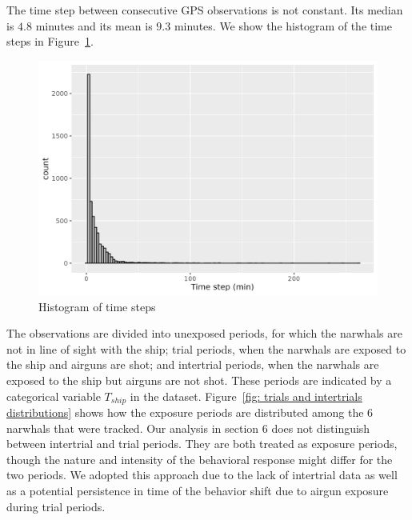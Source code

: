 \documentclass[aoas]{imsart}
\theoremstyle{definition}
\theoremstyle{remark}
\theoremstyle{remark}
\newcommand {\1}{\mathbb{1}}
\begin{document}
The time step between consecutive GPS observations is not constant. Its median is $4.8$ minutes and its mean is $9.3$ minutes. We show the histogram of the time steps in Figure~\ref{fig:alltimestepshisto}.

\begin{figure}[ht!]
	\centering
	\includegraphics[scale=0.4]{images/data_exploration/all_time_steps_histo}
	\caption{Histogram of time steps}
	\label{fig:alltimestepshisto}
\end{figure}



The observations are divided into unexposed periods, for which the narwhals are not in line of sight with the ship; trial periods, when the narwhals are exposed to the ship and airguns are shot; and intertrial periods, when the narwhals are exposed to the ship but airguns are not shot. These periods are indicated by a categorical variable $T_{ship}$ in the dataset. Figure~\ref{fig: trials and intertrials distributions} shows how the exposure periods are distributed among the $6$ narwhals that were tracked. Our analysis in section 6 does not distinguish between intertrial and trial periods. They are both treated as exposure periods, though the nature and intensity of the behavioral response might differ for the two periods. We adopted this approach due to the lack of intertrial data as well as a potential persistence in time of the behavior shift due to airgun exposure during trial periods.
\end{document}
